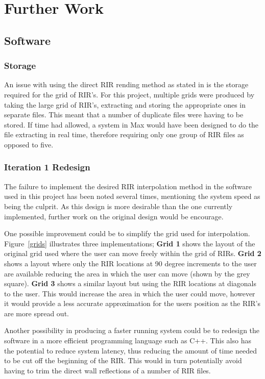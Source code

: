 \documentclass[../../main.tex]{subfiles}
\begin{document}
\section{Further Work}
\label{furtherwork}
	
	\subsection{Software}
		\subsubsection{Storage}
			An issue with using the direct \ac{RIR} rending method as stated in \cite{Savioja1999} is the storage required for the grid of \ac{RIR}'s. For this project, multiple grids were produced by taking the large grid of \ac{RIR}'s, extracting and storing the appropriate ones in separate files. This meant that a number of duplicate files were having to be stored. If time had allowed, a system in Max would have been designed to do the file extracting in real time, therefore requiring only one group of \ac{RIR} files as opposed to five. 

		\subsubsection{Iteration 1 Redesign}
			The failure to implement the desired \ac{RIR} interpolation method in the software used in this project has been noted several times, mentioning the system speed as being the culprit. As this design is more desirable than the one currently implemented, further work on the original design would be encourage.

			One possible improvement could be to simplify the grid used for interpolation. Figure~\ref{grids} illustrates three implementations; \textbf{Grid 1} shows the layout of the original grid used where the user can move freely within the grid of RIRs. \textbf{Grid 2} shows a layout where only the \ac{RIR} locations at 90 degree increments to the user are available reducing the area in which the user can move (shown by the grey square). \textbf{Grid 3} shows a similar layout but using the \ac{RIR} locations at diagonals to the user. This would increase the area in which the user could move, however it would provide a less accurate approximation for the users position as the \ac{RIR}'s are more spread out.

			Another possibility in producing a faster running system could be to redesign the software in a more efficient programming language such as C++. This also has the potential to reduce system latency, thus reducing the amount of time needed to be cut off the beginning of the \ac{RIR}. This would in turn potentially avoid having to trim the direct wall reflections of a number of \ac{RIR} files.
\end{document}
